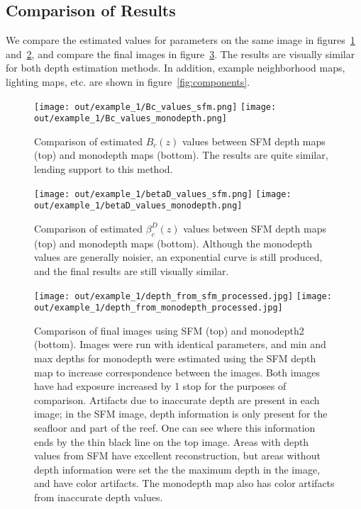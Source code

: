 \documentclass[10pt,twocolumn,letterpaper]{article}
\begin{document}
\subsection{Comparison of Results}

We compare the estimated values for parameters on the same image in figures~\ref{fig:Bccomparison}
and~\ref{fig:betaDcomparison}, and compare the final images in figure~\ref{fig:imgcomparison}.
The results are visually similar for both depth estimation methods. In addition, example neighborhood maps,
lighting maps, etc. are shown in figure~\ref{fig:components}.

\begin{figure}[!t]
\begin{center}
\texttt{[image: out/example\_1/Bc\_values\_sfm.png]}\newline
\texttt{[image: out/example\_1/Bc\_values\_monodepth.png]}
\end{center}
   \caption{\small{Comparison of estimated $B_c(z)$ values between SFM depth maps (top) and monodepth maps (bottom).
   The results are quite similar, lending support to this method.}}
\label{fig:Bccomparison}
\end{figure}

\begin{figure}[!t]
\begin{center}
\texttt{[image: out/example\_1/betaD\_values\_sfm.png]}\newline
\texttt{[image: out/example\_1/betaD\_values\_monodepth.png]}
\end{center}
   \caption{\small{Comparison of estimated $\beta^D_c(z)$ values between SFM depth maps (top) and monodepth maps (bottom).
   Although the monodepth values are generally noisier, an exponential curve is still produced, and the final results
   are still visually similar.}}
\label{fig:betaDcomparison}
\end{figure}

\begin{figure}[!t]
\begin{center}
\texttt{[image: out/example\_1/depth\_from\_sfm\_processed.jpg]}\newline
\texttt{[image: out/example\_1/depth\_from\_monodepth\_processed.jpg]}
\end{center}
   \caption{\small{Comparison of final images using SFM (top) and monodepth2 (bottom). Images were run
   with identical parameters, and min and max depths for monodepth were estimated using
   the SFM depth map to increase correspondence between the images. Both images have had exposure
   increased by 1 stop for the purposes of comparison. Artifacts due to inaccurate depth are present in each image;
   in the SFM image, depth information is only present for the seafloor and part of the reef. One can see where
   this information ends by the thin black line on the top image.
   Areas with depth values from SFM have excellent reconstruction, but areas without depth information
   were set the the maximum depth in the image, and have color artifacts. The monodepth map also has color artifacts
   from inaccurate depth values.}}
\label{fig:imgcomparison}
\end{figure}
\end{document}
